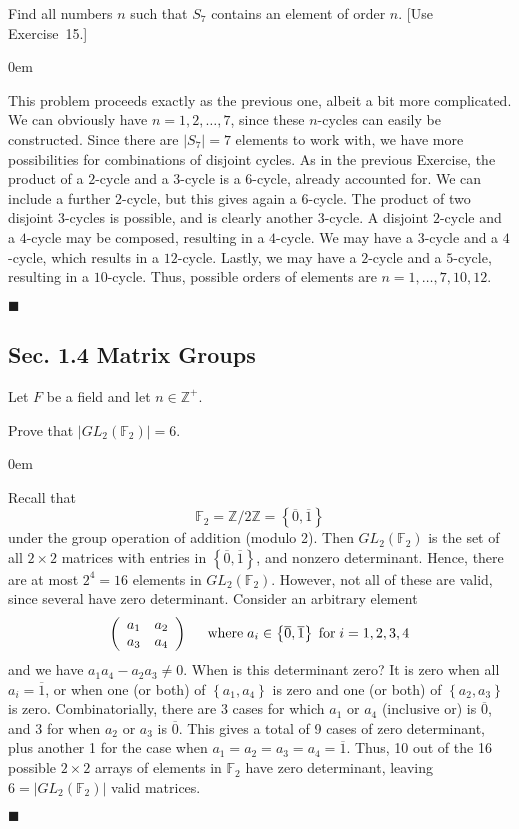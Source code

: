 \documentclass[12pt]{article}
\renewcommand{\qed}{\hfill$\blacksquare$}
\renewenvironment{proof}{\begin{addmargin}[1em]{0em}\begin{newproof}}{\end{newproof}\end{addmargin}\qed}
\newenvironment{problem}[2][Exercise]{\begin{trivlist}
\item[\hskip \labelsep {\bfseries #1}\hskip \labelsep {\bfseries #2.}]}{\end{trivlist}}
\begin{document}
\begin{problem}{1.3.19}
Find all numbers $n$ such that $S_7$ contains an element of order $n$. [Use Exercise~15.]
\end{problem}
\begin{proof}
This problem proceeds exactly as the previous one, albeit a bit more complicated. We can obviously have $n=1,2,\ldots,7$, since these $n$-cycles can easily be constructed. Since there are $\left|S_7\right|=7$ elements to work with, we have more possibilities for combinations of disjoint cycles. As in the previous Exercise, the product of a $2$-cycle and a $3$-cycle is a $6$-cycle, already accounted for. We can include a further $2$-cycle, but this gives again a $6$-cycle. The product of two disjoint $3$-cycles is possible, and is clearly another $3$-cycle. A disjoint $2$-cycle and a $4$-cycle may be composed, resulting in a $4$-cycle. We may have a $3$-cycle and a $4$-cycle, which results in a $12$-cycle. Lastly, we may have a $2$-cycle and a $5$-cycle, resulting in a $10$-cycle. Thus, possible orders of elements are $n=1,\ldots,7,10,12$.
\end{proof}





\subsection*{Sec. 1.4 Matrix Groups}
Let $F$ be a field and let $n\in \mathbb{Z}^+$.
\begin{problem}{1.4.1}
Prove that $\left|GL_2\left(\mathbb{F}_2\right)\right|=6$.
\end{problem}
\begin{proof}
Recall that
$$ \mathbb{F}_2 = \mathbb{Z}/2\mathbb{Z} = \left\{ \overline{0}, \overline{1}\right\} $$
under the group operation of addition (modulo 2). Then $GL_2\left(\mathbb{F}_2\right)$ is the set of all $2\times 2$ matrices with entries in $\left\{\overline{0},\overline{1}\right\}$, and nonzero determinant. Hence, there are at most $2^4=16$ elements in $GL_2\left(\mathbb{F}_2\right)$. However, not all of these are valid, since several have zero determinant. Consider an arbitrary element
$$ \left(\begin{array}{cc} a_1 & a_2 \\ a_3 & a_4 \end{array}\right) \hspace{5mm} \text{where} \; a_i\in \left\{\overline{0},\overline{1}\right\} \; \text{for} \; i=1,2,3,4 $$
and we have $a_1a_4-a_2a_3 \neq 0$. When is this determinant zero? It is zero when all $a_i=\overline{1}$, or when one (or both) of $\left\{a_1,a_4\right\}$ is zero and one (or both) of $\left\{a_2,a_3\right\}$ is zero. Combinatorially, there are 3 cases for which $a_1$ or $a_4$ (inclusive or) is $\overline{0}$, and 3 for when $a_2$ or $a_3$ is $\overline{0}$. This gives a total of 9 cases of zero determinant, plus another 1 for the case when $a_1=a_2=a_3=a_4=\overline{1}$. Thus, 10 out of the 16 possible $2\times 2$ arrays of elements in $\mathbb{F}_2$ have zero determinant, leaving $6=\left|GL_2\left(\mathbb{F}_2\right)\right|$ valid matrices.
\end{proof}
\end{document}

